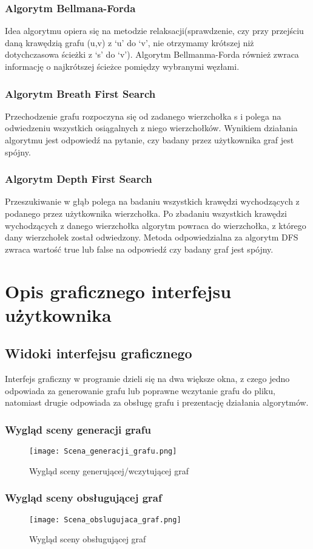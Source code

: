 \documentclass[10pt]{article}
\begin{document}
\subsubsection{Algorytm Bellmana-Forda}
Idea algorytmu opiera się na metodzie relaksacji(sprawdzenie, czy przy przejściu daną krawędzią grafu (u,v) z ‘u’ do ‘v’, nie otrzymamy krótszej niż dotychczasowa ścieżki z ‘s’ do ‘v’). Algorytm Bellmanma-Forda również zwraca informację o najkrótszej ścieżce pomiędzy wybranymi węzłami.
\subsubsection{Algorytm Breath First Search}
Przechodzenie grafu rozpoczyna się od zadanego wierzchołka s i polega na odwiedzeniu wszystkich osiągalnych z niego wierzchołków. Wynikiem działania algorytmu jest odpowiedź na pytanie, czy badany przez użytkownika graf jest spójny.
\subsubsection{Algorytm Depth First Search}
Przeszukiwanie w głąb polega na badaniu wszystkich krawędzi wychodzących z podanego przez użytkownika wierzchołka. Po zbadaniu wszystkich krawędzi wychodzących z danego wierzchołka algorytm powraca do wierzchołka, z którego dany wierzchołek został odwiedzony. Metoda odpowiedzialna za algorytm DFS zwraca wartość true lub false na odpowiedź czy badany graf jest spójny.
\newpage
\section{Opis graficznego interfejsu użytkownika}
\subsection{Widoki interfejsu graficznego}
Interfejs graficzny w programie dzieli się na dwa większe okna, z czego jedno odpowiada za generowanie grafu lub poprawne wczytanie grafu do pliku, natomiast drugie odpowiada za obsługę grafu i prezentację działania algorytmów.
\subsubsection{Wygląd sceny generacji grafu}
\begin{figure}[h]
\centering
\texttt{[image: Scena\_generacji\_grafu.png]}
\caption{Wygląd sceny generującej/wczytującej graf}
\end{figure}
\subsubsection{Wygląd sceny obsługującej graf}
\begin{figure}[h]
\centering
\texttt{[image: Scena\_obslugujaca\_graf.png]}
\caption{Wygląd sceny obsługującej graf}
\end{figure}
\newpage
\end{document}
